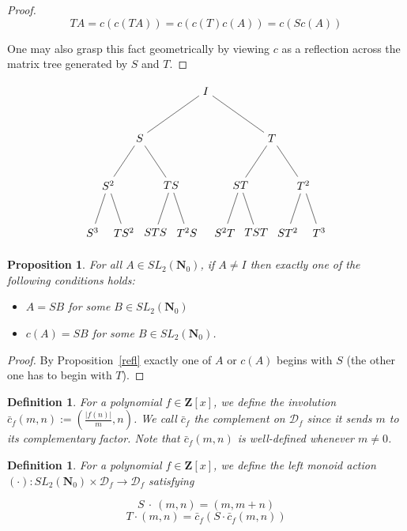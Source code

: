 \documentclass{article}
\newtheorem{definition}[theorem]{Definition}  %
\newtheorem{proposition}[theorem]{Proposition}  %
\begin{document}
\begin{proof}

$$TA = c(c(TA)) = c(c(T) c(A)) = c(Sc(A))$$

One may also grasp this fact geometrically by viewing $c$ as a reflection across the matrix tree generated by $S$ and $T$.
\end{proof}

$$\begin{tikzpicture}[level distance=15mm,
level 1/.style={sibling distance=42mm},
level 2/.style={sibling distance=20mm},
level 3/.style={sibling distance=10mm}]
\node {$I$}
child {
node {$S$}
child {
node {$S^2$}
child {node {$S^3$}}
child {node {$TS^2$}}
}
child {
node {$TS$}
child {node {$STS$}}
child {node {$T^2S$}}
}
}
child {
node {$T$}
child {
node {$ST$}
child {node {$S^2T$}}
child {node {$TST$}}
}
child {
node {$T^2$}
child {node {$ST^2$}}
child {node {$T^3$}}
}
} ;
\end{tikzpicture}$$

\begin{proposition}\label{uniqueness of factors}
For all $A \in SL_2(\mathbf{N}_0)$, if $A \neq I$ then exactly one of the following conditions holds: 
\begin{itemize}
    \item $A = SB$ for some $B \in SL_2(\mathbf{N}_0)$
    \item $c(A) = SB$ for some $B \in SL_2(\mathbf{N}_0)$.
\end{itemize}
\end{proposition}

\begin{proof}
By Proposition~\ref{refl} exactly one of $A$ or $c(A)$ begins with $S$ (the other one has to begin with $T$).
\end{proof}

\begin{definition}\label{c_bar_f}
For a polynomial $f \in \mathbf{Z}[x]$, we define the involution $\bar{c}_f(m, n) := (\frac{|f(n)|}{m}, n)$. We call $\bar{c}_f$ the complement on $\mathcal{D}_f$ since it sends $m$ to its complementary factor. Note that $\bar{c}_f(m, n)$ is well-defined whenever $m \neq 0$.
\end{definition}

\begin{definition}
For a polynomial $f \in \mathbf{Z}[x]$, we define the left monoid action $(\cdot): SL_2(\mathbf{N}_0) \times \mathcal{D}_f \rightarrow \mathcal{D}_f$ satisfying

$$S  \ \cdot  \ (m, n) = (m, m+n)$$
$$T  \cdot (m, n) = \bar{c}_f (S  \cdot  \bar{c}_f(m, n))$$
\end{definition}
\end{document}
